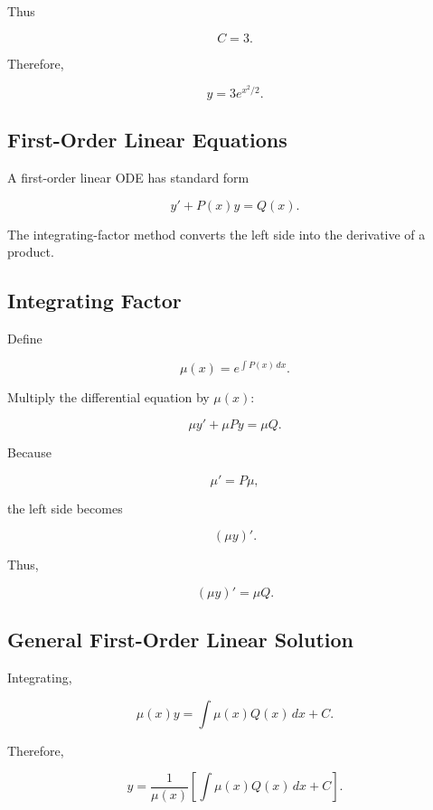 Thus

\[
\boxed{
C=3.
}
\]

Therefore,

\[
\boxed{
y
=
3e^{x^2/2}.
}
\]

\subsection{First-Order Linear Equations}
\label{subsec:first-order-linear-odes}

A first-order linear ODE has standard form

\[
\boxed{
y'
+
P(x)y
=
Q(x).
}
\]

The integrating-factor method converts the left side into the derivative
of a product.

\subsection{Integrating Factor}
\label{subsec:integrating-factor}

Define

\[
\boxed{
\mu(x)
=
e^{\int P(x)\,dx}.
}
\]

Multiply the differential equation by \(\mu(x)\):

\[
\mu y'
+
\mu P y
=
\mu Q.
\]

Because

\[
\mu'
=
P\mu,
\]

the left side becomes

\[
\boxed{
(\mu y)'.
}
\]

Thus,

\[
\boxed{
(\mu y)'
=
\mu Q.
}
\]

\subsection{General First-Order Linear Solution}
\label{subsec:first-order-linear-general-solution}

Integrating,

\[
\mu(x)y
=
\int
\mu(x)Q(x)\,dx
+
C.
\]

Therefore,

\[
\boxed{
y
=
\frac1{\mu(x)}
\left[
\int
\mu(x)Q(x)\,dx
+
C
\right].
}
\]

